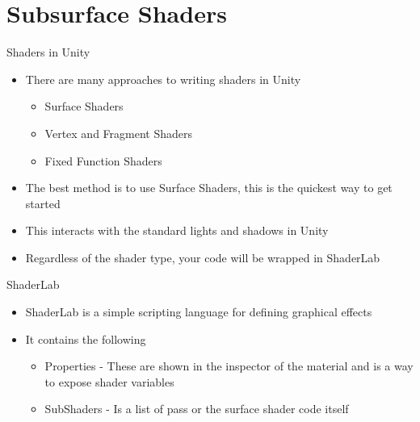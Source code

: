 \part{Subsurface Shaders}
\frame{\partpage}


\begin{frame}{Shaders in Unity}
	\begin{itemize}
		\item There are many approaches to writing shaders in Unity
		\begin{itemize}
			\pause\item Surface Shaders
			\pause\item Vertex and Fragment Shaders
			\pause\item Fixed Function Shaders
		\end{itemize}
		\pause\item The best method is to use Surface Shaders, this is the quickest way to get started
		\pause\item This interacts with the standard lights and shadows in Unity
		\pause\item Regardless of the shader type, your code will be wrapped in ShaderLab 
	\end{itemize}
\end{frame}

\begin{frame}{ShaderLab}
	\begin{itemize}
		\item ShaderLab is a simple scripting language for defining graphical effects
		\pause\item It contains the following
		\begin{itemize}
			\pause\item Properties - These are shown in the inspector of the material and is a way to expose shader variables
			\pause\item SubShaders - Is a list of pass or the surface shader code itself
		\end{itemize}
	\end{itemize}
\end{frame}

